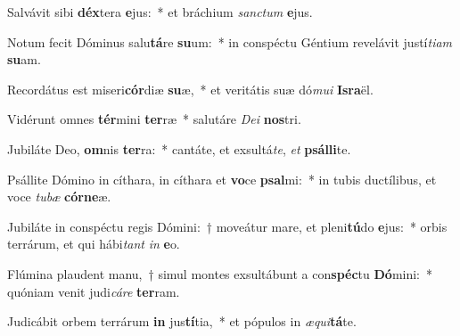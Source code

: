 \item Salvávit sibi \textbf{déx}tera \textbf{e}jus:~* et bráchium \textit{sanc}\textit{tum} \textbf{e}jus.
\item Notum fecit Dóminus salu\textbf{tá}re \textbf{su}um:~* in conspéctu Géntium revelávit justí\textit{ti}\textit{am} \textbf{su}am.
\item Recordátus est miseri\textbf{cór}diæ \textbf{su}æ,~* et veritátis suæ dó\textit{mu}\textit{i} \textbf{Is}\textbf{ra}ël.
\item Vidérunt omnes \textbf{tér}mini \textbf{ter}ræ~* salutáre \textit{De}\textit{i} \textbf{nos}tri.
\item Jubiláte Deo, \textbf{om}nis \textbf{ter}ra:~* cantáte, et exsultá\textit{te}, \textit{et} \textbf{psál}\textbf{li}te.
\item Psállite Dómino in cíthara, in cíthara et \textbf{vo}ce \textbf{psal}mi:~* in tubis ductílibus, et voce \textit{tu}\textit{bæ} \textbf{cór}\textbf{ne}æ.
\item Jubiláte in conspéctu regis Dómini:~† moveátur mare, et pleni\textbf{tú}do \textbf{e}jus:~* orbis terrárum, et qui hábi\textit{tant} \textit{in} \textbf{e}o.
\item Flúmina plaudent manu,~† simul montes exsultábunt a con\textbf{spéc}tu \textbf{Dó}mini:~* quóniam venit judi\textit{cá}\textit{re} \textbf{ter}ram.
\item Judicábit orbem terrárum \textbf{in} jus\textbf{tí}tia,~* et pópulos in \textit{æ}\textit{qui}\textbf{tá}te.
